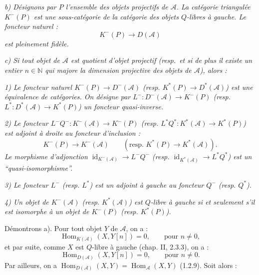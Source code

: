 \clearpage
{}%
\begingroup\small\setlength{\parskip}{0pt}\setlength{\emergencystretch}{1.5em}
\setlength{\abovedisplayskip}{4pt plus 2pt minus 2pt}%
\setlength{\belowdisplayskip}{4pt plus 2pt minus 2pt}%

\noindent\textit{b) Désignons par $P$ l'ensemble des objets projectifs de
$\mathcal A$. La catégorie triangulée $K^{-}(P)$ est une sous-catégorie de
la catégorie des objets $Q$-libres à gauche. Le foncteur naturel :}
\[
K^{-}(P)\longrightarrow D(\mathcal A)
\]
\noindent\textit{est pleinement fidèle.}

\noindent\textit{c) Si tout objet de $\mathcal A$ est quotient d'objet
projectif (resp.\ et si de plus il existe un entier $n\in\mathbb N$ qui
majore la dimension projective des objets de $\mathcal A$), alors :}

\noindent\textit{1) Le foncteur naturel
$K^{-}(P)\longrightarrow D^{-}(\mathcal A)$ (resp.
$K^{*}(P)\longrightarrow D^{*}(\mathcal A)$) est une équivalence de
catégories. On désigne par
$L^{-}\colon D^{-}(\mathcal A)\longrightarrow K^{-}(P)$ (resp.
$L^{*}\colon D^{*}(\mathcal A)\longrightarrow K^{*}(P)$) un foncteur
quasi-inverse.}

\noindent\textit{2) Le foncteur
$L^{-}Q^{-}\colon K^{-}(\mathcal A)\longrightarrow K^{-}(P)$ (resp.
$L^{*}Q^{*}\colon K^{*}(\mathcal A)\longrightarrow K^{*}(P)$) est adjoint
à droite au foncteur d'inclusion :}
\[
K^{-}(P)\longrightarrow K^{-}(\mathcal A)
\qquad
(\text{resp. }K^{*}(P)\longrightarrow K^{*}(\mathcal A)).
\]
\noindent\textit{Le morphisme d'adjonction
$\operatorname{id}_{K^{-}(\mathcal A)}\longrightarrow L^{-}Q^{-}$
(resp.
$\operatorname{id}_{K^{*}(\mathcal A)}\longrightarrow L^{*}Q^{*}$) est
un ``quasi-isomorphisme''.}

\noindent\textit{3) Le foncteur $L^{-}$ (resp. $L^{*}$) est un adjoint à
gauche au foncteur $Q^{-}$ (resp. $Q^{*}$).}

\noindent\textit{4) Un objet de $K^{-}(\mathcal A)$ (resp.
$K^{*}(\mathcal A)$) est $Q$-libre à gauche si et seulement s'il est
isomorphe à un objet de $K^{-}(P)$ (resp. $K^{*}(P)$).}

Démontrons a). Pour tout objet $Y$ de $\mathcal A$, on a :
\[
\operatorname{Hom}_{K(\mathcal A)}(X,Y[n])=0,
\qquad\text{pour }n\neq0,
\]
et par suite, comme $X$ est $Q$-libre à gauche (chap. II, 2.3.3), on a :
\[
\operatorname{Hom}_{D(\mathcal A)}(X,Y[n])=0,
\qquad\text{pour }n\neq0.
\]
Par ailleurs, on a
$\operatorname{Hom}_{D(\mathcal A)}(X,Y)
=\operatorname{Hom}_{\mathcal A}(X,Y)$ (1.2.9). Soit alors :

